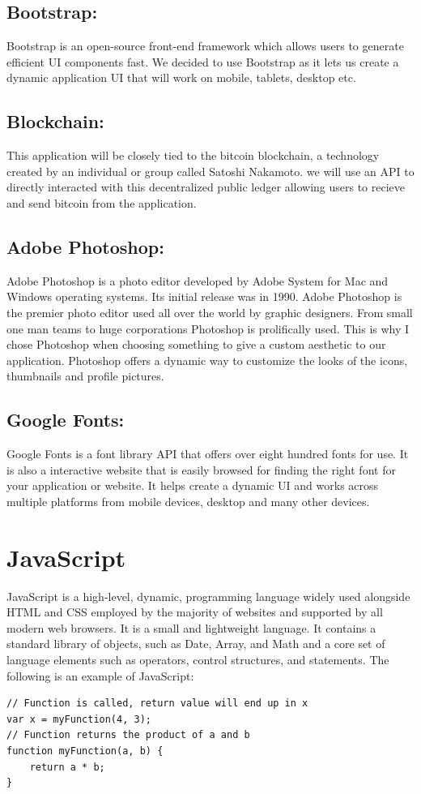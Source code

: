 \subsection{Bootstrap:}
Bootstrap is an open-source front-end framework which allows users to generate efficient UI components fast. We decided to use Bootstrap as it lets us create a dynamic application UI that will work on mobile, tablets, desktop etc.

\subsection{Blockchain:}
This application will be closely tied to the bitcoin blockchain, a technology created by an individual or group called Satoshi Nakamoto. we will use an API to directly interacted with this decentralized public ledger allowing users to recieve and send bitcoin from the application.

\subsection{Adobe Photoshop:}
Adobe Photoshop is a photo editor developed by Adobe System for Mac and Windows operating systems. Its initial release was in 1990. Adobe Photoshop is the premier photo editor used all over the world by graphic designers. From small one man teams to huge corporations Photoshop is prolifically used. This is why I chose Photoshop when choosing something to give a custom aesthetic to our application. Photoshop offers a dynamic way to customize the looks of the icons, thumbnails and profile pictures. 

\subsection{Google Fonts:}
Google Fonts is a font library API that offers over eight hundred fonts for use. It is also a interactive website that is easily browsed for finding the right font for your application or website. It helps create a dynamic UI and works across multiple platforms from mobile devices, desktop and many other devices.

\section{JavaScript}
JavaScript is a high-level, dynamic, programming language widely used alongside HTML and CSS employed by the majority of websites and supported by all modern web browsers. It is a small and lightweight language. It contains a standard library of objects, such as Date, Array, and Math and a core set of language elements such as operators, control structures, and statements\cite{Introduc25}.
The following is an example of JavaScript\cite{JavaScri59}:
\begin{lstlisting}
// Function is called, return value will end up in x
var x = myFunction(4, 3);   
// Function returns the product of a and b
function myFunction(a, b) {
    return a * b;   
}
\end{lstlisting}


